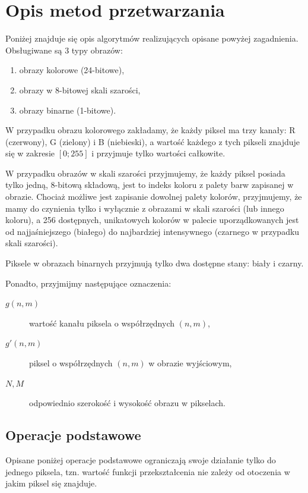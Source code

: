 \documentclass{classrep}
\begin{document}
\section{Opis metod przetwarzania}

Poniżej znajduje się opis algorytmów realizujących opisane powyżej zagadnienia. Obsługiwane są 3 typy obrazów:
\begin{enumerate}
 \item obrazy kolorowe (24-bitowe),
 \item obrazy w 8-bitowej skali szarości,
 \item obrazy binarne (1-bitowe).
\end{enumerate}

W przypadku obrazu kolorowego zakładamy, że każdy piksel ma trzy kanały: R (czerwony), G (zielony) i B (niebieski), a wartość każdego z tych pikseli znajduje się w zakresie $[0; 255]$ i przyjmuje tylko wartości całkowite.

W przypadku obrazów w skali szarości przyjmujemy, że każdy piksel posiada tylko jedną, 8-bitową składową, jest to indeks koloru z palety barw zapisanej w obrazie. Chociaż możliwe jest zapisanie dowolnej palety kolorów, przyjmujemy, że mamy do czynienia tylko i wyłącznie z obrazami w skali szarości (lub innego koloru), a 256 dostępnych, unikatowych kolorów w palecie uporządkowanych jest od najjaśniejszego (białego) do najbardziej intensywnego (czarnego \ppauza w przypadku skali szarości).

Piksele w obrazach binarnych przyjmują tylko dwa dostępne stany: biały i czarny.

Ponadto, przyjmijmy następujące oznaczenia:
\begin{description}
 \item[$g(n, m)$] wartość kanału piksela o współrzędnych $(n, m)$,
 \item[$g'(n, m)$] piksel o współrzędnych $(n, m)$ w obrazie wyjściowym,
 \item[$N, M$] odpowiednio szerokość i wysokość obrazu w pikselach.
\end{description}


\subsection{Operacje podstawowe}

Opisane poniżej operacje podstawowe ograniczają swoje działanie tylko do jednego piksela, tzn. wartość funkcji przekształcenia nie zależy od otoczenia w jakim piksel się znajduje.
\end{document}
